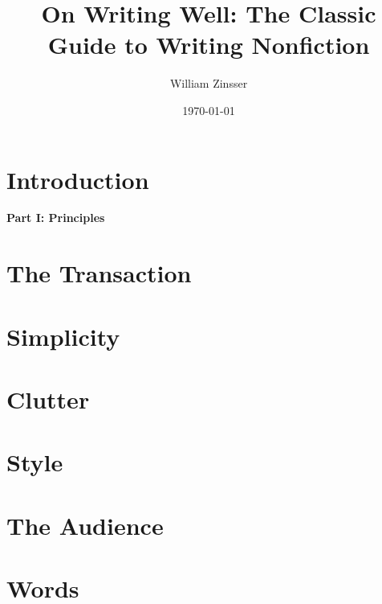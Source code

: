 \documentclass{article}
\title{On Writing Well: The Classic Guide to Writing Nonfiction}
\author{William Zinsser}
\date{\today}
\numberwithin{equation}{section}
\begin{document}
\maketitle
\tableofcontents
\vspace{5mm}


\section*{Introduction}

\begin{center}\LARGE\sf
	\textbf{Part I: Principles}
\end{center}

\section{The Transaction}


\section{Simplicity}


\section{Clutter}


\section{Style}


\section{The Audience}


\section{Words}
\end{document}
